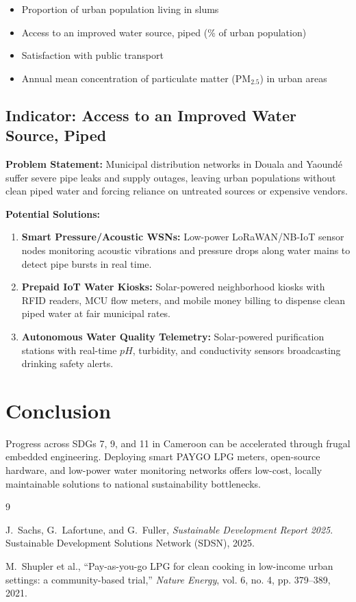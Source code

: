 \documentclass[11pt, a4paper]{article}
\begin{document}
\begin{itemize}
  \itemsep 0em
  \item Proportion of urban population living in slums
  \item Access to an improved water source, piped (\% of urban population)
  \item Satisfaction with public transport
  \item Annual mean concentration of particulate matter ($\text{PM}_{2.5}$) in urban areas
\end{itemize}

\subsection{Indicator: Access to an Improved Water Source, Piped}

\textbf{Problem Statement:} Municipal distribution networks in Douala and Yaoundé suffer severe pipe leaks and supply outages, leaving urban populations without clean piped water and forcing reliance on untreated sources or expensive vendors.

\textbf{Potential Solutions:}
\begin{enumerate}
  \itemsep 0em
  \item \textbf{Smart Pressure/Acoustic WSNs:} Low-power LoRaWAN/NB-IoT sensor nodes monitoring acoustic vibrations and pressure drops along water mains to detect pipe bursts in real time.
  \item \textbf{Prepaid IoT Water Kiosks:} Solar-powered neighborhood kiosks with RFID readers, MCU flow meters, and mobile money billing to dispense clean piped water at fair municipal rates.
  \item \textbf{Autonomous Water Quality Telemetry:} Solar-powered purification stations with real-time $pH$, turbidity, and conductivity sensors broadcasting drinking safety alerts.
\end{enumerate}

\section{Conclusion}
Progress across SDGs 7, 9, and 11 in Cameroon can be accelerated through frugal embedded engineering. Deploying smart PAYGO LPG meters, open-source hardware, and low-power water monitoring networks offers low-cost, locally maintainable solutions to national sustainability bottlenecks.

\newpage
\begin{thebibliography}{9}

  J.~Sachs, G.~Lafortune, and G.~Fuller, \textit{Sustainable Development Report 2025}. Sustainable Development Solutions Network (SDSN), 2025.

  M.~Shupler et al., ``Pay-as-you-go LPG for clean cooking in low-income urban settings: a community-based trial,'' \textit{Nature Energy}, vol. 6, no. 4, pp. 379--389, 2021.

\end{thebibliography}
\end{document}

